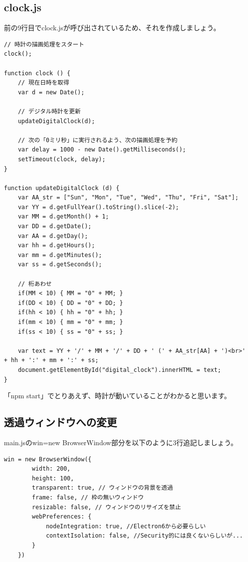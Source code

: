 \documentclass[mingoth,11pt,a4j,uplatex]{jsarticle}
\begin{document}
\subsection{clock.js}
前の9行目でclock.jsが呼び出されているため、それを作成しましょう。
\begin{lstlisting}[caption=DigitalClock：clock.js]
// 時計の描画処理をスタート
clock();

function clock () {
    // 現在日時を取得
    var d = new Date();

    // デジタル時計を更新
    updateDigitalClock(d);

    // 次の「0ミリ秒」に実行されるよう、次の描画処理を予約
    var delay = 1000 - new Date().getMilliseconds();
    setTimeout(clock, delay);
}

function updateDigitalClock (d) {
    var AA_str = ["Sun", "Mon", "Tue", "Wed", "Thu", "Fri", "Sat"];
    var YY = d.getFullYear().toString().slice(-2);
    var MM = d.getMonth() + 1;
    var DD = d.getDate();
    var AA = d.getDay();
    var hh = d.getHours();
    var mm = d.getMinutes();
    var ss = d.getSeconds();

    // 桁あわせ
    if(MM < 10) { MM = "0" + MM; }
    if(DD < 10) { DD = "0" + DD; }
    if(hh < 10) { hh = "0" + hh; }
    if(mm < 10) { mm = "0" + mm; }
    if(ss < 10) { ss = "0" + ss; }

    var text = YY + '/' + MM + '/' + DD + ' (' + AA_str[AA] + ')<br>' + hh + ':' + mm + ':' + ss;
    document.getElementById("digital_clock").innerHTML = text;
}
\end{lstlisting}

「npm start」でとりあえず、時計が動いていることがわかると思います。

\subsection{透過ウィンドウへの変更}
main.jsのwin=new BrowserWindow部分を以下のように3行追記しましょう。

\begin{lstlisting}[caption=DigitalClock：main.js ]
    win = new BrowserWindow({
        width: 200,
        height: 100,
        transparent: true, // ウィンドウの背景を透過
        frame: false, // 枠の無いウィンドウ
        resizable: false, // ウィンドウのリサイズを禁止
        webPreferences: {
            nodeIntegration: true, //Electron6から必要らしい
            contextIsolation: false, //Security的には良くないらしいが...
        }
    })
\end{lstlisting}
\end{document}

